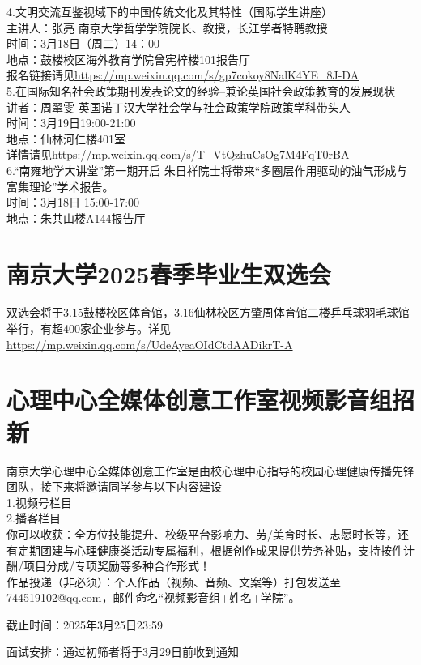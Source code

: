 \documentclass[letterpaper, 12pt]{article}
\begin{document}
\begin{multicols}{2}
4.文明交流互鉴视域下的中国传统文化及其特性（国际学生讲座）\\
主讲人：张亮 南京大学哲学学院院长、教授，长江学者特聘教授\\
时间：3月18日（周二）14：00\\
地点：鼓楼校区海外教育学院曾宪梓楼101报告厅\\
报名链接请见\url{https://mp.weixin.qq.com/s/gp7cokoy8NalK4YE_8J-DA}\\

5.在国际知名社会政策期刊发表论文的经验--兼论英国社会政策教育的发展现状\\
讲者：周翠雯 英国诺丁汉大学社会学与社会政策学院政策学科带头人\\
时间：3月19日19:00-21:00\\
地点：仙林河仁楼401室\\
详情请见\url{https://mp.weixin.qq.com/s/T_VtQzhuCsOg7M4FqT0rBA}\\

6.“南雍地学大讲堂”第一期开启
朱日祥院士将带来“多圈层作用驱动的油气形成与富集理论”学术报告。\\
时间：3月18日 15:00-17:00\\
地点：朱共山楼A144报告厅\\
\section{南京大学2025春季毕业生双选会}
双选会将于3.15鼓楼校区体育馆，3.16仙林校区方肇周体育馆二楼乒乓球羽毛球馆举行，有超400家企业参与。详见\url{https://mp.weixin.qq.com/s/UdeAyeaOIdCtdAADikrT-A}\\
\section{心理中心全媒体创意工作室视频影音组招新}
南京大学心理中心全媒体创意工作室是由校心理中心指导的校园心理健康传播先锋团队，接下来将邀请同学参与以下内容建设——\\
1.视频号栏目\\
2.播客栏目\\
你可以收获：全方位技能提升、校级平台影响力、劳/美育时长、志愿时长等，还有定期团建与心理健康类活动专属福利，根据创作成果提供劳务补贴，支持按件计酬/项目分成/专项奖励等多种合作形式！\\
作品投递（非必须）：个人作品（视频、音频、文案等）打包发送至744519102@qq.com，邮件命名“视频影音组+姓名+学院”。

截止时间：2025年3月25日23:59

面试安排：通过初筛者将于3月29日前收到通知


\end{multicols}
\end{document}
